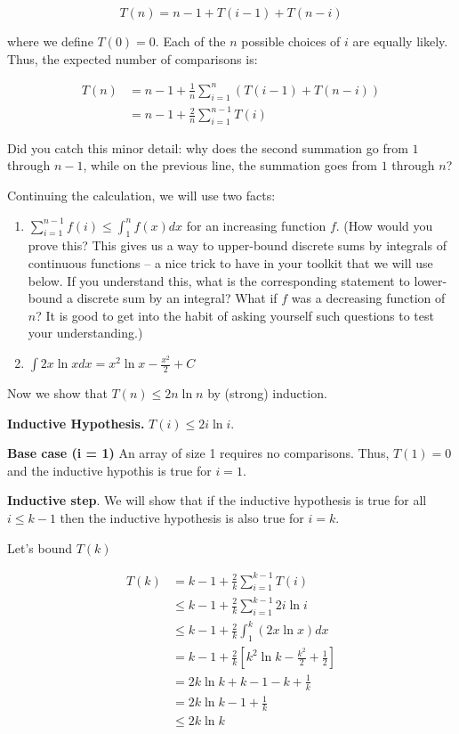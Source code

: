 \documentclass [12pt]{article}
\begin{document}
$$
T(n) = n - 1 + T(i - 1) + T(n - i)
$$

where we define $T(0) = 0$. Each of the $n$ possible choices of $i$ are equally likely. Thus, the
expected number of comparisons is:

\begin{align*}
T(n) &= n - 1 + \frac{1}{n} \sum_{i=1}^n \left(T(i - 1) + T(n - i)\right) \\
&= n - 1 + \frac{2}{n} \sum_{i=1}^{n-1} T(i) \tag{Each $T(i)$ shows up twice in the sum}
\end{align*}

Did you catch this minor detail: why does the second summation go from $1$ through $n - 1$, while on the previous line, the summation goes from $1$ through $n$?

Continuing the calculation, we will use two facts:

\begin{enumerate}
  \item $\sum_{i=1}^{n-1} f(i) \leq \int_1^n f(x) dx$ for an increasing function $f$.
  (How would you prove this? This gives us a way to upper-bound discrete sums by integrals of continuous functions – a nice trick to have in your toolkit that we will use below. If you understand this, what is the corresponding statement to lower-bound a discrete sum by an integral? What if $f$ was a decreasing function of $n$? It is good to get into the habit of asking yourself such questions to test your understanding.)
  \item $\int 2x \ln x dx = x^2 \ln x - \frac{x^2}{2} + C$
\end{enumerate}

Now we show that $T(n) \leq 2n \ln n$ by (strong) induction.

\textbf{Inductive Hypothesis.} $T(i) \leq 2i \ln i$.

\textbf{Base case (i = 1)} An array of size 1 requires no comparisons. Thus, $T(1) = 0$ and the inductive hypothis is true for $i = 1$.

\textbf{Inductive step}. We will show that if the inductive hypothesis is true for all $i \leq k - 1$ then
the inductive hypothesis is also true for $i = k$.

Let's bound $T(k)$

\begin{align*}
T(k) &= k - 1 + \frac{2}{k}\sum_{i=1}^{k-1}T(i) \tag{by definition} \\
&\leq k - 1 + \frac{2}{k}\sum_{i=1}^{k-1}2i \ln i \tag{using our strong inductive hypothesis} \\
&\leq k - 1 + \frac{2}{k}\int_{1}^k (2x \ln x) dx \tag{Using fact 1 above} \\
&= k - 1 + \frac{2}{k}\left[k^2 \ln k - \frac{k^2}{2} + \frac{1}{2} \right] \tag{Using fact 2 above} \\
&= 2k \ln k + k - 1 - k + \frac{1}{k} \tag{simplify} \\
&= 2k \ln k - 1 + \frac{1}{k} \\
&\leq 2k \ln k
\end{align*}
\end{document}
